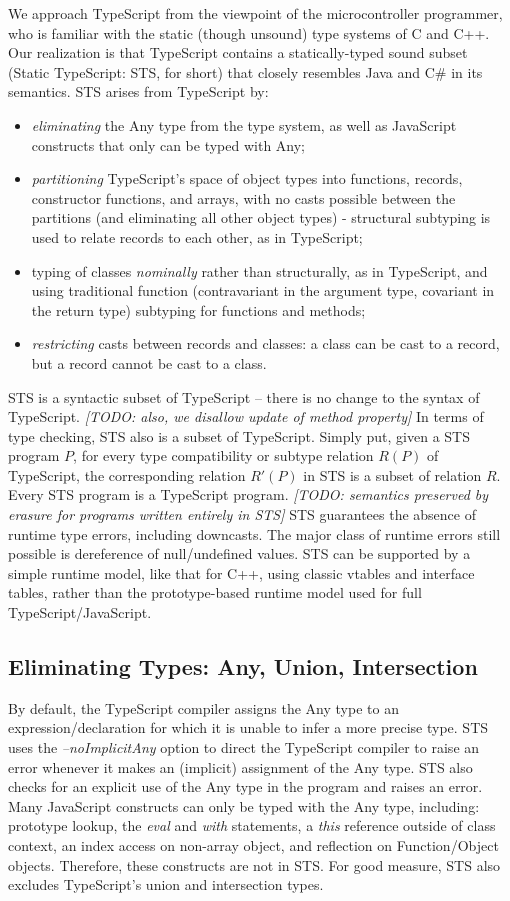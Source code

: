 We approach TypeScript from the viewpoint of the microcontroller programmer, who is 
familiar with the static (though unsound) type systems of C and C++. Our realization is that TypeScript contains a
statically-typed sound subset (Static TypeScript: STS, for short) that closely resembles Java and C\# in its semantics.
STS arises from TypeScript by:
\begin{itemize}
\item \emph{eliminating} the Any type from the type system, as well as JavaScript constructs that only can be typed with Any;
\item \emph{partitioning} TypeScript's space of object types into functions, records, constructor functions, and arrays, with no casts 
    possible between the partitions (and eliminating all other object types) - structural subtyping is used to relate records 
    to each other, as in TypeScript;
\item typing of classes \emph{nominally} rather than structurally, as in TypeScript, and using traditional function (contravariant 
    in the argument type, covariant in the return type) subtyping for functions and methods;
\item \emph{restricting} casts between records and classes: a class can be cast to a record, but a record cannot be cast to a class.
\end{itemize}
STS is a syntactic subset of TypeScript -- there is no change to the syntax of TypeScript.
\emph{[TODO: also, we disallow update of method property]}
In terms of type checking, STS also is a subset of TypeScript. Simply put, given a STS program $P$,
for every type compatibility or subtype relation $R(P)$ of TypeScript, the corresponding relation $R'(P)$ in STS
is a subset of relation $R$. Every STS program is a TypeScript program. 
\emph{[TODO: semantics preserved by erasure for programs written entirely in STS]}
STS guarantees the absence of runtime type errors, including downcasts.
The major class of runtime errors still possible is dereference of null/undefined values. 
STS can be supported by a simple runtime model, like that for C++, using classic vtables and interface tables,
rather than the prototype-based runtime model used for full TypeScript/JavaScript.

\subsection{Eliminating Types: Any, Union, Intersection}

By default, the TypeScript compiler assigns the Any type to an expression/declaration for which it is unable to 
infer a more precise type. STS uses the \emph{--noImplicitAny} option to direct the TypeScript compiler to raise an error 
whenever it makes an (implicit) assignment of the Any type.  STS also checks for an explicit use of the Any type in
the program and raises an error. Many JavaScript constructs can only be typed with the Any type, including: prototype lookup,
the \emph{eval} and \emph{with} statements, a \emph{this} reference outside of class context, an index access on non-array object, and
reflection on Function/Object objects. Therefore, these constructs are not in STS. For good measure,
STS also excludes TypeScript's union and intersection types.

